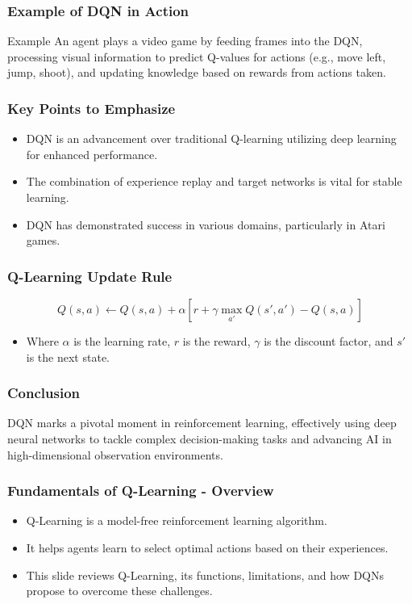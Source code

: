 \documentclass{beamer}
\begin{document}
\begin{frame}[fragile]
    \frametitle{Example of DQN in Action}
    \begin{block}{Example}
        An agent plays a video game by feeding frames into the DQN, processing visual information to predict Q-values for actions (e.g., move left, jump, shoot), and updating knowledge based on rewards from actions taken.
    \end{block}
\end{frame}

\begin{frame}[fragile]
    \frametitle{Key Points to Emphasize}
    \begin{itemize}
        \item DQN is an advancement over traditional Q-learning utilizing deep learning for enhanced performance.
        \item The combination of experience replay and target networks is vital for stable learning.
        \item DQN has demonstrated success in various domains, particularly in Atari games.
    \end{itemize}
\end{frame}

\begin{frame}[fragile]
    \frametitle{Q-Learning Update Rule}
    \begin{equation}
        Q(s, a) \leftarrow Q(s, a) + \alpha \left[ r + \gamma \max_{a'} Q(s', a') - Q(s, a) \right]
    \end{equation}
    \begin{itemize}
        \item Where \( \alpha \) is the learning rate, \( r \) is the reward, \( \gamma \) is the discount factor, and \( s' \) is the next state.
    \end{itemize}
\end{frame}

\begin{frame}[fragile]
    \frametitle{Conclusion}
    DQN marks a pivotal moment in reinforcement learning, effectively using deep neural networks to tackle complex decision-making tasks and advancing AI in high-dimensional observation environments.
\end{frame}

\begin{frame}[fragile]
    \frametitle{Fundamentals of Q-Learning - Overview}
    \begin{itemize}
        \item Q-Learning is a model-free reinforcement learning algorithm.
        \item It helps agents learn to select optimal actions based on their experiences.
        \item This slide reviews Q-Learning, its functions, limitations, and how DQNs propose to overcome these challenges.
    \end{itemize}
\end{frame}
\end{document}
